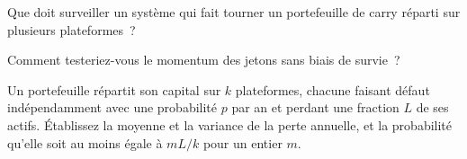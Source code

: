 \begin{interviewq}\label{iq:s1:crypto-medium-frequency-strategies:4}
Que doit surveiller un système qui fait tourner un portefeuille de carry réparti sur plusieurs plateformes~?
\end{interviewq}

\begin{interviewq}\label{iq:s1:crypto-medium-frequency-strategies:5}
Comment testeriez-vous le momentum des jetons sans biais de survie~?
\end{interviewq}

\begin{interviewq}\label{iq:s1:crypto-medium-frequency-strategies:6}
Un portefeuille répartit son capital sur $k$ plateformes, chacune faisant défaut indépendamment avec une probabilité $p$ par an et perdant une fraction $L$ de ses actifs. Établissez la moyenne et la variance
de la perte annuelle, et la probabilité qu'elle soit au moins égale à $mL/k$ pour un entier $m$.
\end{interviewq}
